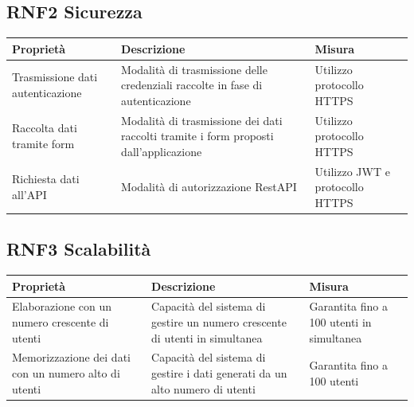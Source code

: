 \documentclass{article}
\begin{document}
\subsection{RNF2 Sicurezza}
\begin{center}
    \begin{longtable}{|p{4cm}|p{8cm}|p{4cm}|}
        \hline
        Proprietà                        & Descrizione                                                                          & Misura                          \\
        \hline
        Trasmissione dati autenticazione & Modalità di trasmissione delle credenziali raccolte in fase di autenticazione        & Utilizzo protocollo HTTPS       \\
        \hline
        Raccolta dati tramite form       & Modalità di trasmissione dei dati raccolti tramite i form proposti dall'applicazione & Utilizzo protocollo HTTPS       \\
        \hline
        Richiesta dati all'API           & Modalità di autorizzazione RestAPI                                                   & Utilizzo JWT e protocollo HTTPS \\
        \hline
    \end{longtable}
\end{center}
\subsection{RNF3 Scalabilità}
\begin{center}
    \begin{longtable}{|p{4cm}|p{8cm}|p{4cm}|}
        \hline
        Proprietà                                            & Descrizione                                                                 & Misura                                    \\
        \hline
        Elaborazione con un numero crescente di utenti       & Capacità del sistema di gestire un numero crescente di utenti in simultanea & Garantita fino a 100 utenti in simultanea \\
        \hline
        Memorizzazione dei dati con un numero alto di utenti & Capacità del sistema di gestire i dati generati da un alto numero di utenti & Garantita fino a 100 utenti               \\
        \hline
    \end{longtable}
\end{center}
\end{document}
